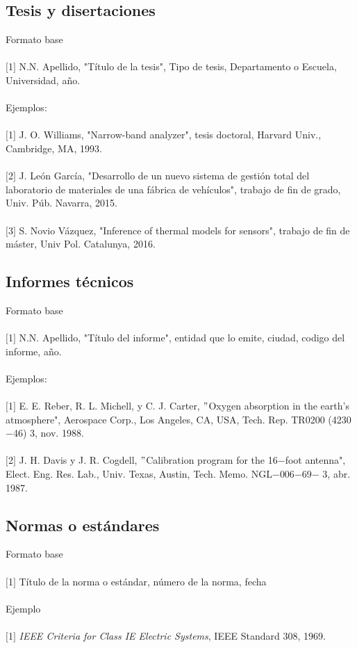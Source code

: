 \documentclass[10pt,letterpaper,twoside,twocolumn]{article}   %
\begin{document}
\subsection*{Tesis y disertaciones}
Formato base\\
\\
$[$1$]$ N.N. Apellido, "Título de la tesis", Tipo de tesis, Departamento o Escuela, Universidad, año.\\
\\
Ejemplos:\\
\\
$[$1$]$ J. O. Williams, "Narrow-band analyzer", tesis doctoral, Harvard Univ., Cambridge, MA, 1993.\\
\\
$[$2$]$ J. León García, "Desarrollo de un nuevo sistema de gestión total del laboratorio de materiales de una fábrica de vehículos", trabajo de fin de grado, Univ. Púb. Navarra, 2015. \\
\\
$[$3$]$ S. Novio Vázquez, "Inference of thermal models for sensors", trabajo de fin de máster, Univ Pol. Catalunya, 2016.
\subsection*{Informes técnicos}
Formato base\\
\\
$[$1$]$ N.N. Apellido, "Título del informe", entidad que lo emite, ciudad, codigo del informe, año.\\
\\
Ejemplos:\\
\\
$[$1$]$ E. E. Reber, R. L. Michell, y C. J. Carter, $"$Oxygen absorption in the earth's atmosphere", Aerospace Corp., Los Angeles, CA, USA, Tech. Rep. TR0200 (4230$-$46) 3, nov. 1988.\\
\\
$[$2$]$ J. H. Davis y J. R. Cogdell, $"$Calibration program for the 16$-$foot antenna", Elect. Eng. Res. Lab., Univ. Texas, Austin, Tech. Memo. NGL$-$006$-$69$-$ 3, abr. 1987.
\subsection*{Normas o estándares}
Formato base\\
\\
$[$1$]$ Título de la norma o estándar, número de la norma, fecha\\
\\
Ejemplo\\
\\
$[$1$]$ \textit{IEEE Criteria for Class IE Electric Systems}, IEEE Standard 308, 1969.\\
\\
\end{document}
